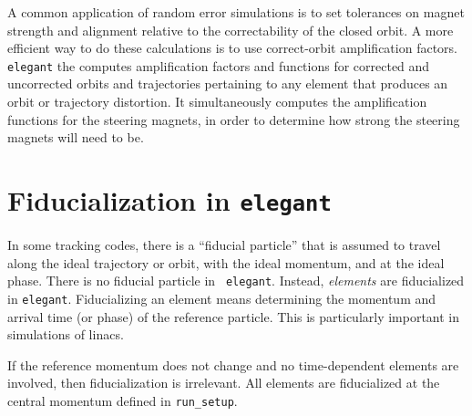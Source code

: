 \documentclass[11pt]{article}
\begin{document}
A common application of random error simulations is to set tolerances
on magnet strength and alignment relative to the correctability of the
closed orbit.  A more efficient way to do these calculations is to use
correct-orbit amplification factors\cite{Borland_PC}.  {\tt elegant}
the computes amplification factors and functions for corrected and
uncorrected orbits and trajectories pertaining to any element that
produces an orbit or trajectory distortion.  It simultaneously
computes the amplification functions for the steering magnets, in
order to determine how strong the steering magnets will need to be.

\section{Fiducialization in {\tt elegant}}

In some tracking codes, there is a ``fiducial particle'' that is
assumed to travel along the ideal trajectory or orbit, with the ideal
momentum, and at the ideal phase.  There is no fiducial particle in {\tt
elegant}.  Instead, {\em elements} are fiducialized in {\tt elegant}.
Fiducializing an element means determining the momentum and arrival time
(or phase) of the reference particle.  This is particularly important
in simulations of linacs.

If the reference momentum does not change and no time-dependent elements
are involved, then fiducialization is irrelevant.  All elements are
fiducialized at the central momentum defined in \verb|run_setup|.
\end{document}
